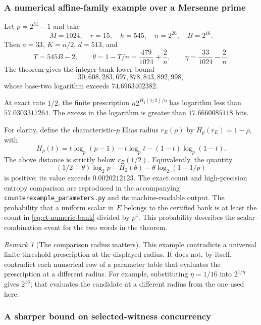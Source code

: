 \documentclass[11pt,letterpaper]{article}
\theoremstyle{definition}
\theoremstyle{remark}
\newtheorem{remark}[theorem]{Remark}
\begin{document}
\subsubsection{A numerical affine-family example over a Mersenne prime}

Let $p=2^{31}-1$ and take
\[
 M=1024,\quad r=15,\quad h=545,\quad n=2^{26},\quad B=2^{16}.
\]
Then $a=33$, $K=n/2$, $d=513$, and
\[
 T=545B-2,\qquad
 \theta=1-T/n=\frac{479}{1024}+\frac2n,
 \qquad
 \eta=\frac{33}{1024}-\frac2n.
\]
The theorem gives the integer bank lower bound
\begin{equation}\label{eq:ct-numeric-bank}
 30{,}608{,}283{,}697{,}878{,}843{,}892{,}998,
\end{equation}
whose base-two logarithm exceeds $74.6963402382$.

At exact rate $1/2$, the finite prescription $n2^{H_2(1/2)/\eta}$ has
logarithm less than $57.0303317264$. The excess in the logarithm is
greater than $17.6660085118$ bits.

For clarity, define the characteristic-$p$ Elias radius $r_E(\rho)$ by
$H_p(r_E)=1-\rho$, with
\[
 H_p(t)=t\log_p(p-1)-t\log_p t-(1-t)\log_p(1-t).
\]
The above distance is strictly below $r_E(1/2)$. Equivalently, the
quantity
\[
 (1/2-\theta)\log_2 p-H_2(\theta)
       -\theta\log_2(1-1/p)
\]
is positive; its value exceeds $0.0020212123$. The exact count and
high-precision entropy comparison are reproduced in the accompanying
\texttt{counterexample\_parameters.py} and its machine-readable output.
The probability that a uniform scalar in $E$ belongs to the certified bank
is at least the count in \eqref{eq:ct-numeric-bank} divided by $p^4$.
This probability describes the scalar-combination event for the two
words in the theorem.

\begin{remark}[The comparison radius matters]
This example contradicts a universal finite threshold prescription at the
displayed radius. It does not, by itself, contradict each numerical row of
a parameter table that evaluates the prescription at a different radius.
For example, substituting $\eta=1/16$ into $2^{1/\eta}$ gives
$2^{16}$; that evaluates the candidate at a different radius from the
one used here.
\end{remark}

\subsubsection{A sharper bound on selected-witness concurrency}
\label{sec:ct-sharp-concurrency}
\end{document}
